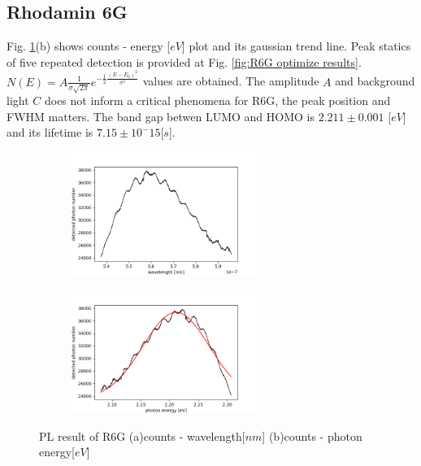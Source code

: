 \documentclass{article}
\begin{document}
\subsection{Rhodamin 6G}
 Fig. \ref{fig:R6G results}(b) shows counts - energy [$eV$] plot and its gaussian trend line.
 Peak statics of five repeated detection is provided at Fig. \ref{fig:R6G optimize results}.
 $N(E) = A \frac{1} {\sigma \sqrt{2\pi}} e^{-\frac{1}{2} \frac{(E-E_0)^2}{\sigma^2}}$ values are obtained.
 The amplitude $A$ and background light $C$ does not inform a critical phenomena for R6G, the peak position and FWHM matters.
 The band gap betwen LUMO and HOMO is $2.211 \pm 0.001$ [$eV$] and its lifetime is $7.15 \pm 10^-15 $[$s$].
 \begin{figure}[ht]
  \centering
  \begin{subfigure}[b]{6cm}
      \centering
      \includegraphics[width=6cm]{../results/R6G(1)_raw_fig.png}
      \caption{}
  \end{subfigure}
  \hfill
  \begin{subfigure}[b]{6cm}
      \centering
      \includegraphics[width=6cm]{../results/R6G(1)_gaussian_fitted_fig.png}
      \caption{}
  \end{subfigure}
  \hfill
  \caption{PL result of R6G (a)counts - wavelength[$nm$] (b)counts - photon energy[$eV$]}
  \label{fig:R6G results}
\end{figure}
\end{document}
